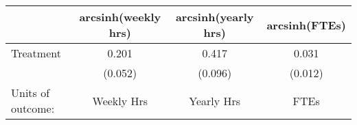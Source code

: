 \begin{tabular}[t]{lccc}
\toprule
  & arcsinh(weekly hrs) & arcsinh(yearly hrs) & arcsinh(FTEs)\\
\midrule
Treatment & 0.201 & 0.417 & 0.031\\
 & (0.052) & (0.096) & (0.012)\\
Units of outcome: & Weekly Hrs & Yearly Hrs & FTEs\\
\bottomrule
\end{tabular}
